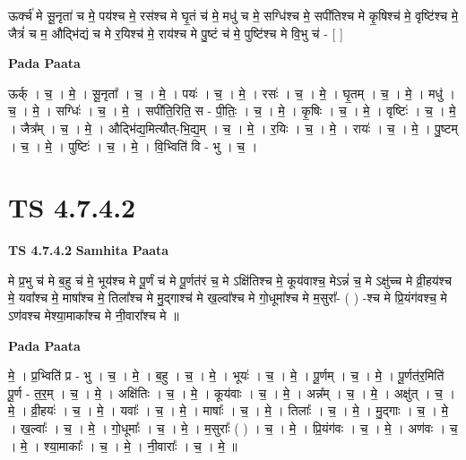 \documentclass[17pt]{extarticle}
\begin{document}
ऊर्क्च॑ मे सू॒नृता॑ च मे॒ पय॑श्च मे॒ रस॑श्च मे घृ॒तं च॑ मे॒ मधु॑ च मे॒ सग्धि॑श्च मे॒ सपी॑तिश्च मे कृ॒षिश्च॑ मे॒ वृष्टि॑श्च मे॒ जैत्रं॑ च म॒ औद्भि॑द्यं च मे र॒यिश्च॑ मे॒ राय॑श्च मे पु॒ष्टं च॑ मे॒ पुष्टि॑श्च मे वि॒भु च॑ - [  ] \newline

\textbf{Pada Paata} \newline

ऊर्क् । च॒ । मे॒ । सू॒नृता᳚ । च॒ । मे॒ । पयः॑ । च॒ । मे॒ । रसः॑ । च॒ । मे॒ । घृ॒तम् । च॒ । मे॒ । मधु॑ । च॒ । मे॒ । सग्धिः॑ । च॒ । मे॒ । सपी॑ति॒रिति॒ स - पी॒तिः॒ । च॒ । मे॒ । कृ॒षिः । च॒ । मे॒ । वृष्टिः॑ । च॒ । मे॒ । जैत्र᳚म् । च॒ । मे॒ । औद्भि॑द्य॒मित्यौत्-भि॒द्य॒म् । च॒ । मे॒ । र॒यिः । च॒ । मे॒ । रायः॑ । च॒ । मे॒ । पु॒ष्टम् । च॒ । मे॒ । पुष्टिः॑ । च॒ । मे॒ । वि॒भ्विति॑ वि - भु । च॒ ।  \newline




\section*{ TS 4.7.4.2 }

\textbf{TS 4.7.4.2 } \newline
\textbf{Samhita Paata} \newline

मे प्र॒भु च॑ मे ब॒हु च॑ मे॒ भूय॑श्च मे पू॒र्णं च॑ मे पू॒र्णत॑रं च॒ मे   ऽक्षि॑तिश्च मे॒ कूय॑वाश्च॒ मेऽन्नं॑ च॒ मे ऽक्षु॑च्च मे व्री॒हय॑श्च मे॒       यवा᳚श्च मे॒ माषा᳚श्च मे॒ तिला᳚श्च मे मु॒द्गाश्च॑ मे ख॒ल्वा᳚श्च मे गो॒धूमा᳚श्च मे म॒सुरा᳚- ( ) -श्च मे प्रि॒यंग॑वश्च॒ मे ऽण॑वश्च मेश्या॒माका᳚श्च मे नी॒वारा᳚श्च मे ॥ \newline

\textbf{Pada Paata} \newline

मे॒ । प्र॒भ्विति॑ प्र - भु । च॒ । मे॒ । ब॒हु । च॒ । मे॒ । भूयः॑ । च॒ । मे॒ । पू॒र्णम् । च॒ । मे॒ । पू॒र्णत॑र॒मिति॑ पू॒र्ण - त॒र॒म् । च॒ । मे॒ । अक्षि॑तिः । च॒ । मे॒ । कूय॑वाः । च॒ । मे॒ । अन्न᳚म् । च॒ । मे॒ । अक्षु॑त् । च॒ । मे॒ । व्री॒हयः॑ । च॒ । मे॒ । यवाः᳚ । च॒ । मे॒ । माषाः᳚ । च॒ । मे॒ । तिलाः᳚ । च॒ । मे॒ । मु॒द्गाः । च॒ । मे॒ । ख॒ल्वाः᳚ । च॒ । मे॒ । गो॒धूमाः᳚ । च॒ । मे॒ । म॒सुराः᳚ ( ) । च॒ । मे॒ । प्रि॒यंग॑वः । च॒ । मे॒ । अण॑वः । च॒ । मे॒ । श्या॒माकाः᳚ । च॒ । मे॒ । नी॒वाराः᳚ । च॒ । मे॒ ॥  \newline
\end{document}
